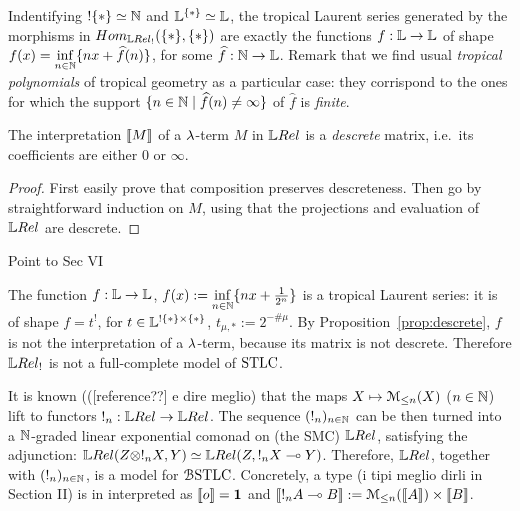 \begin{remark}
 Indentifying $!\{*\}\simeq \mathbb{N}$ and $\mathbb{L}^{\{*\}}\simeq\mathbb{L}$, the tropical Laurent series generated by the morphisms in $\HOM{\LREL_!}{\set{*}}{\set{*}}$ are exactly the functions $f:\mathbb{L}\to\mathbb{L}$ of shape $f(x)=\inf\limits_{n\in\mathbb{N}}\{nx+\widehat f(n)\}$, for some $\widehat f:\mathbb{N}\to\mathbb{L}$.
Remark that we find usual \emph{tropical polynomials} of tropical geometry as a particular case: they corrispond to the ones for which the support $\{n\in\mathbb{N}\mid\widehat f(n)\neq\infty\}$ of $\widehat f$ is \emph{finite}.
\end{remark}

\begin{proposition}\label{prop:descrete}
 The interpretation $\llbracket M\rrbracket$ of a $\lambda$-term $M$ in $\LREL$ is a \emph{descrete} matrix, i.e.\ its coefficients are either $0$ or $\infty$.
\end{proposition}
\begin{proof}
 First easily prove that composition preserves descreteness.
 Then go by straightforward induction on $M$, using that the projections and evaluation of  $\LREL$ are descrete.
\end{proof}

{\color{red} Point to Sec VI}

\begin{example}\label{ex:famous_ex}
 The function $f:\mathbb{L}\to\mathbb{L}$, $f(x):=\inf\limits_{n\in\mathbb{N}}\{nx+\frac{1}{2^n}\}$ is a tropical Laurent series: it is of shape $f=t^!$, for $t\in\mathbb{L}^{!\{*\}\times\{*\}}$, $t_{\mu,*}:=2^{-\# \mu}$.
By Proposition~\ref{prop:descrete}, $f$ is not the interpretation of a $\lambda$-term, because its matrix is not descrete. Therefore $\LREL_!$ is not a full-complete model of $\mathrm{STLC}$.
\end{example}

It is known {\color{red}(([reference??] e dire meglio)} that the maps $X\mapsto \mathcal{M}_{\leq n}(X)$ ($n\in\mathbb{N}$) lift to functors $!_n:\LREL\to\LREL$.
The sequence $(!_n)_{n\in\mathbb{N}}$ can be then turned into a $\mathbb{N}$-graded linear exponential comonad on (the SMC) $\LREL$, satisfying the adjunction:
$\LREL(Z\otimes !_{n}X,Y) \simeq \LREL(Z, !_{n}X\multimap Y)$.
Therefore, $\LREL$, together with $(!_n)_{n\in\mathbb{N}}$, is a model for $\mathcal{B}\mathrm{STLC}$. 
Concretely, a type %
{\color{red}(i tipi meglio dirli in Section II)} is in interpreted as $\llbracket o\rrbracket=\mathbf{1}$ and 
$\llbracket!_{n}A\multimap B\rrbracket:= \mathcal{M}_{\leq n}(\llbracket A\rrbracket) \times \llbracket B\rrbracket$.


